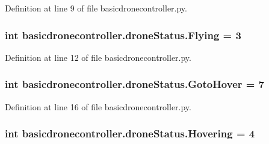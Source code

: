 Definition at line 9 of file basicdronecontroller.\-py.

\hypertarget{classbasicdronecontroller_1_1droneStatus_a5d0bf13223a3b7a124ffaffbdb3dc64b}{
\subsubsection[{Flying}]{\setlength{\rightskip}{0pt plus 5cm}int basicdronecontroller.\-drone\-Status.\-Flying = 3\hspace{0.3cm}{\ttfamily [static]}}}\label{classbasicdronecontroller_1_1droneStatus_a5d0bf13223a3b7a124ffaffbdb3dc64b}


Definition at line 12 of file basicdronecontroller.\-py.

\hypertarget{classbasicdronecontroller_1_1droneStatus_a9ad6b5e9db4ee151a3547a9e89c5289e}{
\subsubsection[{Goto\-Hover}]{\setlength{\rightskip}{0pt plus 5cm}int basicdronecontroller.\-drone\-Status.\-Goto\-Hover = 7\hspace{0.3cm}{\ttfamily [static]}}}\label{classbasicdronecontroller_1_1droneStatus_a9ad6b5e9db4ee151a3547a9e89c5289e}


Definition at line 16 of file basicdronecontroller.\-py.

\hypertarget{classbasicdronecontroller_1_1droneStatus_ae3e6d81aa58b0c268e4084606686317d}{
\subsubsection[{Hovering}]{\setlength{\rightskip}{0pt plus 5cm}int basicdronecontroller.\-drone\-Status.\-Hovering = 4\hspace{0.3cm}{\ttfamily [static]}}}\label{classbasicdronecontroller_1_1droneStatus_ae3e6d81aa58b0c268e4084606686317d}


